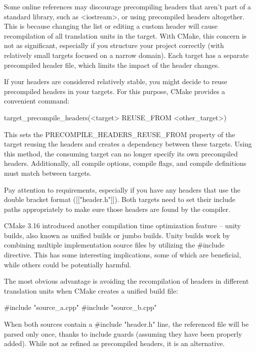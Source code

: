 Some online references may discourage precompiling headers that aren’t part of a standard library, such as <iostream>, or using precompiled headers altogether. This is because changing the list or editing a custom header will cause recompilation of all translation units in the target. With CMake, this concern is not as significant, especially if you structure your project correctly (with relatively small targets focused on a narrow domain). Each target has a separate precompiled header file, which limits the impact of the header changes.

If your headers are considered relatively stable, you might decide to reuse precompiled headers in your targets. For this purpose, CMake provides a convenient command:

\begin{shell}
target_precompile_headers(<target> REUSE_FROM <other_target>)
\end{shell}

This sets the PRECOMPILE\_HEADERS\_REUSE\_FROM property of the target reusing the headers and creates a dependency between these targets. Using this method, the consuming target can no longer specify its own precompiled headers. Additionally, all compile options, compile flags, and compile definitions must match between targets.

Pay attention to requirements, especially if you have any headers that use the double bracket format ([["header.h"]]). Both targets need to set their include paths appropriately to make sure those headers are found by the compiler.


CMake 3.16 introduced another compilation time optimization feature – unity builds, also known as unified builds or jumbo builds. Unity builds work by combining multiple implementation source files by utilizing the \#include directive. This has some interesting implications, some of which are beneficial, while others could be potentially harmful.

The most obvious advantage is avoiding the recompilation of headers in different translation units when CMake creates a unified build file:

\begin{cpp}
#include "source_a.cpp"
#include "source_b.cpp"
\end{cpp}

When both sources contain a \#include "header.h" line, the referenced file will be parsed only once, thanks to include guards (assuming they have been properly added). While not as refined as precompiled headers, it is an alternative.

